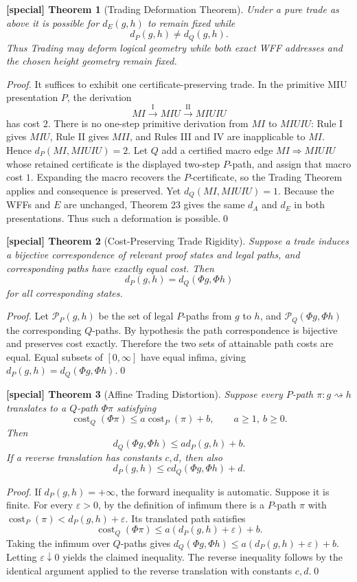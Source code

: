 \documentclass[11pt]{article}
\newtheorem{spthm}{[special] Theorem}
\newcommand{\dE}{d_E}
\begin{document}
\begin{spthm}[Trading Deformation Theorem]
Under a pure trade as above it is possible for $\dE(g,h)$ to remain fixed while
\[d_P(g,h)\ne d_Q(g,h).\]
Thus Trading may deform logical geometry while both exact WFF addresses and the chosen height geometry remain fixed.
\end{spthm}
\textit{Proof.} It suffices to exhibit one certificate-preserving trade. In the primitive MIU presentation $P$, the derivation
\[
MI\xrightarrow{\mathrm I}MIU\xrightarrow{\mathrm{II}}MIUIU
\]
has cost $2$. There is no one-step primitive derivation from $MI$ to $MIUIU$: Rule I gives $MIU$, Rule II gives $MII$, and Rules III and IV are inapplicable to $MI$. Hence $d_P(MI,MIUIU)=2$. Let $Q$ add a certified macro edge $MI\Rightarrow MIUIU$ whose retained certificate is the displayed two-step $P$-path, and assign that macro cost $1$. Expanding the macro recovers the $P$-certificate, so the Trading Theorem applies and consequence is preserved. Yet $d_Q(MI,MIUIU)=1$. Because the WFFs and $E$ are unchanged, Theorem 23 gives the same $d_A$ and $d_E$ in both presentations. Thus such a deformation is possible.\qed


\begin{spthm}[Cost-Preserving Trade Rigidity]
Suppose a trade induces a bijective correspondence of relevant proof states and legal paths, and corresponding paths have exactly equal cost. Then
\[d_P(g,h)=d_Q(\Phi g,\Phi h)\]
for all corresponding states.
\end{spthm}
\textit{Proof.} Let $\mathcal P_P(g,h)$ be the set of legal $P$-paths from $g$ to $h$, and $\mathcal P_Q(\Phi g,\Phi h)$ the corresponding $Q$-paths. By hypothesis the path correspondence is bijective and preserves cost exactly. Therefore the two sets of attainable path costs are equal. Equal subsets of $[0,\infty]$ have equal infima, giving $d_P(g,h)=d_Q(\Phi g,\Phi h)$.\qed


\begin{spthm}[Affine Trading Distortion]
Suppose every $P$-path $\pi:g\rightsquigarrow h$ translates to a $Q$-path $\Phi\pi$ satisfying
\[
\operatorname{cost}_Q(\Phi\pi)\le a\operatorname{cost}_P(\pi)+b,
\qquad a\ge1,\ b\ge0.
\]
Then
\[d_Q(\Phi g,\Phi h)\le a d_P(g,h)+b.\]
If a reverse translation has constants $c,d$, then also
\[d_P(g,h)\le c d_Q(\Phi g,\Phi h)+d.\]
\end{spthm}
\textit{Proof.} If $d_P(g,h)=+\infty$, the forward inequality is automatic. Suppose it is finite. For every $\varepsilon>0$, by the definition of infimum there is a $P$-path $\pi$ with $\operatorname{cost}_P(\pi)<d_P(g,h)+\varepsilon$. Its translated path satisfies
\[
\operatorname{cost}_Q(\Phi\pi)\le a(d_P(g,h)+\varepsilon)+b.
\]
Taking the infimum over $Q$-paths gives $d_Q(\Phi g,\Phi h)\le a(d_P(g,h)+\varepsilon)+b$. Letting $\varepsilon\downarrow0$ yields the claimed inequality. The reverse inequality follows by the identical argument applied to the reverse translation with constants $c,d$.\qed
\end{document}
